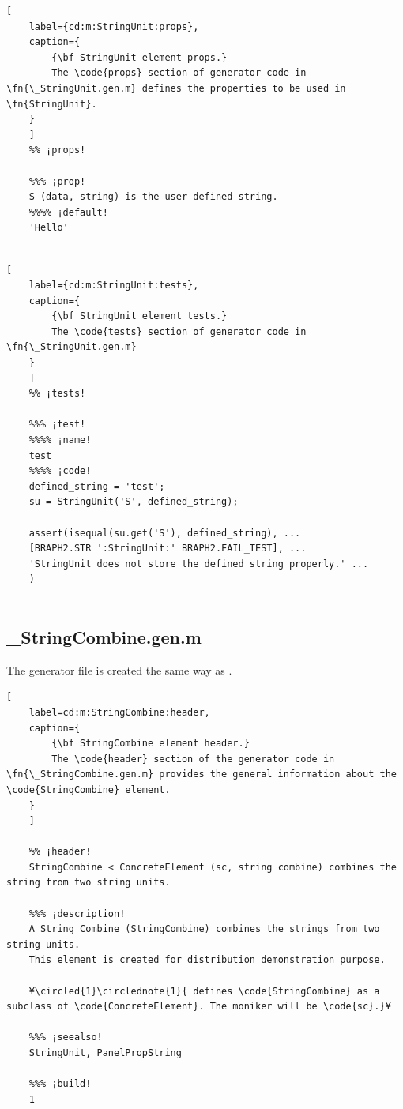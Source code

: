 \documentclass{tufte-handout}
\begin{document}
\begin{lstlisting}[
	label={cd:m:StringUnit:props},
	caption={
		{\bf StringUnit element props.}
		The \code{props} section of generator code in \fn{\_StringUnit.gen.m} defines the properties to be used in \fn{StringUnit}.
	}
	]
	%% ¡props!
	
	%%% ¡prop! 
	S (data, string) is the user-defined string.
	%%%% ¡default!
	'Hello'
	
\end{lstlisting}

\begin{lstlisting}[
	label={cd:m:StringUnit:tests},
	caption={
		{\bf StringUnit element tests.}
		The \code{tests} section of generator code in \fn{\_StringUnit.gen.m}
	}
	]
	%% ¡tests!
	
	%%% ¡test!
	%%%% ¡name!
	test
	%%%% ¡code!
	defined_string = 'test';
	su = StringUnit('S', defined_string);
	
	assert(isequal(su.get('S'), defined_string), ...
	[BRAPH2.STR ':StringUnit:' BRAPH2.FAIL_TEST], ...
	'StringUnit does not store the defined string properly.' ...
	)
	
\end{lstlisting}


\subsection{\_StringCombine.gen.m}

The  generator file is created the same way as .

\begin{lstlisting}[
	label=cd:m:StringCombine:header,
	caption={
		{\bf StringCombine element header.}
		The \code{header} section of the generator code in \fn{\_StringCombine.gen.m} provides the general information about the \code{StringCombine} element.
	}
	]
	
	%% ¡header!
	StringCombine < ConcreteElement (sc, string combine) combines the string from two string units.
	
	%%% ¡description!
	A String Combine (StringCombine) combines the strings from two string units.
	This element is created for distribution demonstration purpose.
	
	¥\circled{1}\circlednote{1}{ defines \code{StringCombine} as a subclass of \code{ConcreteElement}. The moniker will be \code{sc}.}¥
	
	%%% ¡seealso!
	StringUnit, PanelPropString
	
	%%% ¡build!
	1
\end{lstlisting}
\end{document}

